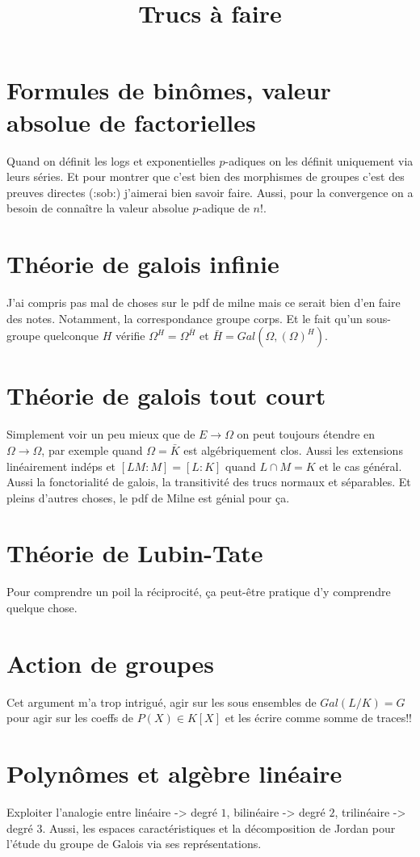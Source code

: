 \documentclass[a4paper,12pt]{book}
\title{Trucs à faire}
\date{}
\theoremstyle{plain}
\theoremstyle{definition}
\theoremstyle{remark}
\begin{document}
\maketitle
\section{Formules de binômes, valeur absolue de factorielles}
Quand on définit les logs et exponentielles $p$-adiques on les
définit uniquement via leurs séries. Et pour montrer que c'est
bien des morphismes de groupes c'est des preuves directes (:sob:)
j'aimerai bien savoir faire. Aussi, pour la convergence on a
besoin de connaître la valeur absolue $p$-adique de $n!$.

\section{Théorie de galois infinie}
J'ai compris pas mal de choses sur le pdf de milne mais ce serait
bien d'en faire des notes. Notamment, la correspondance
groupe corps. Et le fait qu'un sous-groupe quelconque $H$
vérifie $\Omega^H=\Omega^{\bar H}$ et 
$\bar H=Gal(\Omega, (\Omega)^H)$. 
\section{Théorie de galois tout court}
Simplement voir un peu mieux que de $E\to\Omega$ on peut
toujours étendre en $\Omega\to \Omega$, par exemple quand 
$\Omega= \bar K$ est algébriquement clos. Aussi les extensions
linéairement indéps et $[LM:M]=[L:K]$ quand $L\cap M=K$ et le
cas général. Aussi la fonctorialité de galois, la transitivité
des trucs normaux et séparables. Et pleins d'autres choses,
le pdf de Milne est génial pour ça.
\section{Théorie de Lubin-Tate}
Pour comprendre un poil la réciprocité, ça peut-être pratique
d'y comprendre quelque chose.
\section{Action de groupes}
Cet argument m'a trop intrigué, agir sur les sous ensembles de
$Gal(L/K)=G$ pour agir sur les coeffs de $P(X)\in K[X]$ et
les écrire comme somme de traces!!

\section{Polynômes et algèbre linéaire}
Exploiter l'analogie entre linéaire -> degré $1$, 
bilinéaire -> degré $2$, trilinéaire -> degré $3$. Aussi,
les espaces caractéristiques et la décomposition de Jordan pour
l'étude du groupe de Galois via ses représentations.
\end{document}
